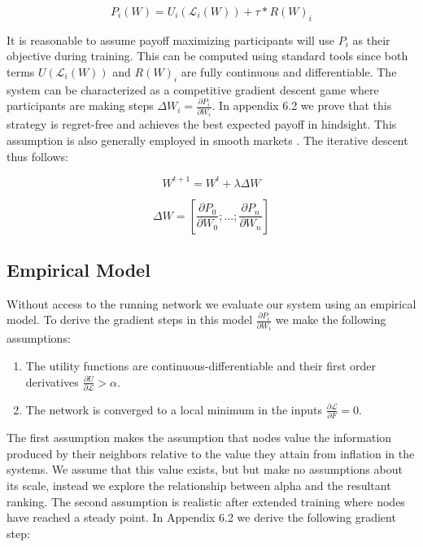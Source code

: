 \documentclass{article}
\begin{document}
\begin{equation}
P_i (W) = U_i(\mathcal{L}_i(W)) + \tau * R(W)_i
\end{equation}

It is reasonable to assume payoff maximizing participants will use $P_i$ as their objective during training. This can be computed using standard tools since both terms $U(\mathcal{L}_i(W))$ and $R(W)_i$ are fully continuous and differentiable. The system can be characterized as a competitive gradient descent game where participants are making steps $\Delta W_i = \frac{\partial P_i}{\partial W_i}$. In appendix 6.2 we prove that this strategy is regret-free and achieves the best expected payoff in hindsight. This assumption is also generally employed in smooth markets \cite{balduzzi2020smooth}. The iterative descent thus follows:


\begin{equation}
W^{t+1} = W^{t} + \lambda \Delta W 
\end{equation}

\begin{equation}
\label{eq:grad_step2}
\Delta W = [\frac{\partial P_0}{\partial W_0} ; ... ;\frac{\partial P_n}{\partial W_n}]
\end{equation}

\subsection{Empirical Model}

Without access to the running network we evaluate our system using an empirical model. To derive the gradient steps in this model $\frac{\partial P_i}{\partial W_i}$ we make the following assumptions: 

\begin{enumerate}
	\item The utility functions are continuous-differentiable and their first order derivatives  $\frac{\partial U}{\partial \mathcal{L}} > \alpha$.    
	\item  The network is converged to a local minimum in the inputs $\frac{\partial\mathcal{L}}{\partial F} = 0$.
\end{enumerate}  

The first assumption makes the assumption that nodes value the information produced by their neighbors relative to the value they attain from inflation in the systems. We assume that this value exists, but but make no assumptions about its scale, instead we explore the relationship between alpha and the resultant ranking. The second assumption is realistic after extended training where nodes have reached a steady point. In Appendix 6.2 we derive the following gradient step:
\end{document}
